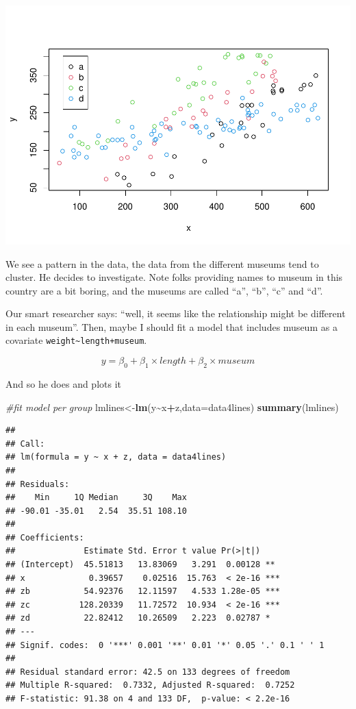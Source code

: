 \documentclass[
]{book}
\newenvironment{Shaded}{\begin{snugshade}}{\end{snugshade}}
\newcommand{\AttributeTok}[1]{\textcolor[rgb]{0.13,0.29,0.53}{#1}}
\newcommand{\CommentTok}[1]{\textcolor[rgb]{0.56,0.35,0.01}{\textit{#1}}}
\newcommand{\FunctionTok}[1]{\textcolor[rgb]{0.13,0.29,0.53}{\textbf{#1}}}
\newcommand{\NormalTok}[1]{#1}
\newcommand{\OtherTok}[1]{\textcolor[rgb]{0.56,0.35,0.01}{#1}}
\newcommand{\SpecialCharTok}[1]{\textcolor[rgb]{0.81,0.36,0.00}{\textbf{#1}}}
\begin{document}
\includegraphics{ECOMODbook_files/figure-latex/a7.11-1.pdf}

We see a pattern in the data, the data from the different museums tend to cluster. He decides to investigate. Note folks providing names to museum in this country are a bit boring, and the museums are called ``a'', ``b'', ``c'' and ``d''.

Our smart researcher says: ``well, it seems like the relationship might be different in each museum''. Then, maybe I should fit a model that includes museum as a covariate \texttt{weight\textasciitilde{}length+museum}.

\[y=\beta_0+\beta_1 \times length +\beta_2 \times museum\]

And so he does and plots it

\begin{Shaded}
\begin{Highlighting}[]
\CommentTok{\#fit model per group}
\NormalTok{lmlines}\OtherTok{\textless{}{-}}\FunctionTok{lm}\NormalTok{(y}\SpecialCharTok{\textasciitilde{}}\NormalTok{x}\SpecialCharTok{+}\NormalTok{z,}\AttributeTok{data=}\NormalTok{data4lines)}
\FunctionTok{summary}\NormalTok{(lmlines)}
\end{Highlighting}
\end{Shaded}

\begin{verbatim}
## 
## Call:
## lm(formula = y ~ x + z, data = data4lines)
## 
## Residuals:
##    Min     1Q Median     3Q    Max 
## -90.01 -35.01   2.54  35.51 108.10 
## 
## Coefficients:
##              Estimate Std. Error t value Pr(>|t|)    
## (Intercept)  45.51813   13.83069   3.291  0.00128 ** 
## x             0.39657    0.02516  15.763  < 2e-16 ***
## zb           54.92376   12.11597   4.533 1.28e-05 ***
## zc          128.20339   11.72572  10.934  < 2e-16 ***
## zd           22.82412   10.26509   2.223  0.02787 *  
## ---
## Signif. codes:  0 '***' 0.001 '**' 0.01 '*' 0.05 '.' 0.1 ' ' 1
## 
## Residual standard error: 42.5 on 133 degrees of freedom
## Multiple R-squared:  0.7332, Adjusted R-squared:  0.7252 
## F-statistic: 91.38 on 4 and 133 DF,  p-value: < 2.2e-16
\end{verbatim}
\end{document}
